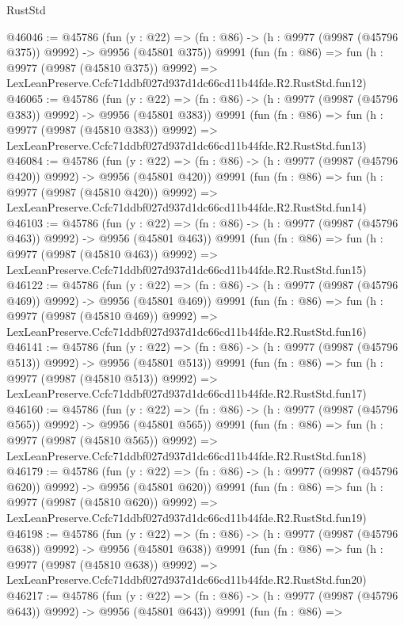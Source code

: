 \begin{lexlean}{RustStd}
\begin{coremodule}
@46046 := @45786
    (fun (y : @22) => (fn : @86) -> (h : @9977 (@9987 (@45796 @375)) @9992) -> @9956 (@45801 @375))
    @9991
    (fun (fn : @86) =>
    fun (h : @9977 (@9987 (@45810 @375)) @9992) =>
    LexLeanPreserve.Ccfc71ddbf027d937d1dc66cd11b44fde.R2.RustStd.fun12)
@46065 := @45786
    (fun (y : @22) => (fn : @86) -> (h : @9977 (@9987 (@45796 @383)) @9992) -> @9956 (@45801 @383))
    @9991
    (fun (fn : @86) =>
    fun (h : @9977 (@9987 (@45810 @383)) @9992) =>
    LexLeanPreserve.Ccfc71ddbf027d937d1dc66cd11b44fde.R2.RustStd.fun13)
@46084 := @45786
    (fun (y : @22) => (fn : @86) -> (h : @9977 (@9987 (@45796 @420)) @9992) -> @9956 (@45801 @420))
    @9991
    (fun (fn : @86) =>
    fun (h : @9977 (@9987 (@45810 @420)) @9992) =>
    LexLeanPreserve.Ccfc71ddbf027d937d1dc66cd11b44fde.R2.RustStd.fun14)
@46103 := @45786
    (fun (y : @22) => (fn : @86) -> (h : @9977 (@9987 (@45796 @463)) @9992) -> @9956 (@45801 @463))
    @9991
    (fun (fn : @86) =>
    fun (h : @9977 (@9987 (@45810 @463)) @9992) =>
    LexLeanPreserve.Ccfc71ddbf027d937d1dc66cd11b44fde.R2.RustStd.fun15)
@46122 := @45786
    (fun (y : @22) => (fn : @86) -> (h : @9977 (@9987 (@45796 @469)) @9992) -> @9956 (@45801 @469))
    @9991
    (fun (fn : @86) =>
    fun (h : @9977 (@9987 (@45810 @469)) @9992) =>
    LexLeanPreserve.Ccfc71ddbf027d937d1dc66cd11b44fde.R2.RustStd.fun16)
@46141 := @45786
    (fun (y : @22) => (fn : @86) -> (h : @9977 (@9987 (@45796 @513)) @9992) -> @9956 (@45801 @513))
    @9991
    (fun (fn : @86) =>
    fun (h : @9977 (@9987 (@45810 @513)) @9992) =>
    LexLeanPreserve.Ccfc71ddbf027d937d1dc66cd11b44fde.R2.RustStd.fun17)
@46160 := @45786
    (fun (y : @22) => (fn : @86) -> (h : @9977 (@9987 (@45796 @565)) @9992) -> @9956 (@45801 @565))
    @9991
    (fun (fn : @86) =>
    fun (h : @9977 (@9987 (@45810 @565)) @9992) =>
    LexLeanPreserve.Ccfc71ddbf027d937d1dc66cd11b44fde.R2.RustStd.fun18)
@46179 := @45786
    (fun (y : @22) => (fn : @86) -> (h : @9977 (@9987 (@45796 @620)) @9992) -> @9956 (@45801 @620))
    @9991
    (fun (fn : @86) =>
    fun (h : @9977 (@9987 (@45810 @620)) @9992) =>
    LexLeanPreserve.Ccfc71ddbf027d937d1dc66cd11b44fde.R2.RustStd.fun19)
@46198 := @45786
    (fun (y : @22) => (fn : @86) -> (h : @9977 (@9987 (@45796 @638)) @9992) -> @9956 (@45801 @638))
    @9991
    (fun (fn : @86) =>
    fun (h : @9977 (@9987 (@45810 @638)) @9992) =>
    LexLeanPreserve.Ccfc71ddbf027d937d1dc66cd11b44fde.R2.RustStd.fun20)
@46217 := @45786
    (fun (y : @22) => (fn : @86) -> (h : @9977 (@9987 (@45796 @643)) @9992) -> @9956 (@45801 @643))
    @9991
    (fun (fn : @86) =>

\end{coremodule}
\end{lexlean}
